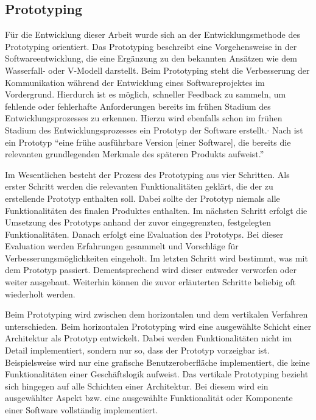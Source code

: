 \subsection{Prototyping}

Für die Entwicklung dieser Arbeit wurde sich an der Entwicklungsmethode des Prototyping orientiert.
Das Prototyping beschreibt eine Vorgehensweise in der Softwareentwicklung, die eine Ergänzung zu den bekannten Ansätzen wie dem Wasserfall- oder V-Modell darstellt.\autocite[Vgl.][S. 14]{MS-Floyd.1984}
Beim Prototyping steht die Verbesserung der Kommunikation während der Entwicklung eines Softwareprojektes im Vordergrund.
Hierdurch ist es möglich, schneller Feedback zu sammeln, um fehlende oder fehlerhafte Anforderungen bereits im frühen Stadium des Entwicklungsprozesses zu erkennen.
Hierzu wird ebenfalls schon im frühen Stadium des Entwicklungsprozesses ein Prototyp der Software erstellt.\autocite[Vgl.][S. 3]{MS-Floyd.1984}$^,$\autocite[Vgl.][S. 368]{MS-Alpar.2019}
Nach \citeauthor{MS-Alpar.2019} ist ein Prototyp \enquote{eine frühe ausführbare Version [einer Software], die bereits die relevanten grundlegenden Merkmale des späteren Produkts aufweist.}\autocite[Siehe][S. 369]{MS-Alpar.2019}

Im Wesentlichen besteht der Prozess des Prototyping aus vier Schritten.
Als erster Schritt werden die relevanten Funktionalitäten geklärt, die der zu erstellende Prototyp enthalten soll.
Dabei sollte der Prototyp niemals alle Funktionalitäten des finalen Produktes enthalten.
Im nächsten Schritt erfolgt die Umsetzung des Prototyps anhand der zuvor eingegrenzten, festgelegten Funktionalitäten.
Danach erfolgt eine Evaluation des Prototyps.
Bei dieser Evaluation werden Erfahrungen gesammelt und Vorschläge für Verbesserungsmöglichkeiten eingeholt.
Im letzten Schritt wird bestimmt, was mit dem Prototyp passiert.
Dementsprechend wird dieser entweder verworfen oder weiter ausgebaut.
Weiterhin können die zuvor erläuterten Schritte beliebig oft wiederholt werden.\autocite[Vgl.][S. 4 f.]{MS-Floyd.1984}

Beim Prototyping wird zwischen dem horizontalen und dem vertikalen Verfahren unterschieden.
Beim horizontalen Prototyping wird eine ausgewählte Schicht einer Architektur als Prototyp entwickelt.
Dabei werden Funktionalitäten nicht im Detail implementiert, sondern nur so, dass der Prototyp vorzeigbar ist.
Beispielsweise wird nur eine grafische Benutzeroberfläche implementiert, die keine Funktionalitäten einer Geschäftslogik aufweist.
Das vertikale Prototyping bezieht sich hingegen auf alle Schichten einer Architektur.
Bei diesem wird ein ausgewählter Aspekt bzw. eine ausgewählte Funktionalität oder Komponente einer Software vollständig implementiert.\autocite[Vgl.][Abschnitt \enquote{Arten von Prototypen}]{MS-Kuhrmann.26.09.2012}\autocite[Vgl.][S. 4]{MS-Floyd.1984}

